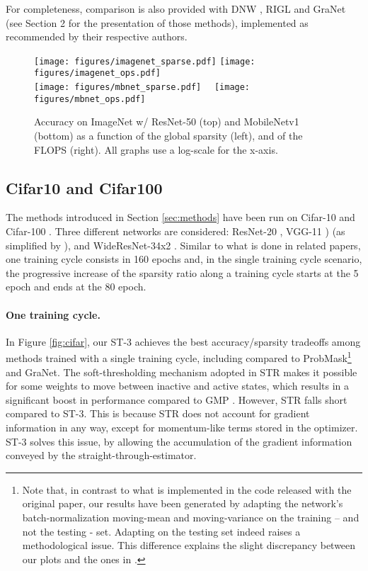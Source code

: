 \documentclass[10pt,twocolumn,letterpaper]{article}
\begin{document}
For completeness, comparison is also provided with DNW \cite{Wortsman2019}, RIGL \cite{Evci2020} and GraNet \cite{Liu2021} (see Section 2 for the presentation of those methods), implemented as recommended by their respective authors.

\begin{figure*}
  \centering
    \texttt{[image: figures/imagenet\_sparse.pdf]}
    \texttt{[image: figures/imagenet\_ops.pdf]}\\
    \texttt{[image: figures/mbnet\_sparse.pdf]}~~
    \texttt{[image: figures/mbnet\_ops.pdf]}
  \caption{Accuracy on ImageNet w/ ResNet-50 (top) and MobileNetv1 (bottom) as a function of the global sparsity (left), and of the FLOPS (right). All graphs use a log-scale for the x-axis.}\label{fig:imagenet}
\end{figure*}

\label{sec:cifar}

\subsection{Cifar10 and Cifar100}

The methods introduced in Section \ref{sec:methods} have been run on Cifar-10 and Cifar-100 \cite{Krizhevsky2009}. Three different networks are considered: ResNet-20 \cite{He2015}, VGG-11 \cite{Simonyan2014}) (as simplified by \cite{Liu2019}), and WideResNet-34x2 \cite{ZagoruykoK16}.
Similar to what is done in related papers, one training cycle consists in 160 epochs and, in the single training cycle scenario, the progressive increase of the sparsity ratio along a training cycle starts at the 5 epoch and ends at the 80 epoch.


\paragraph{One training cycle.} In Figure \ref{fig:cifar}, our ST-3 achieves the best accuracy/sparsity tradeoffs among methods trained with a single training cycle, including compared to ProbMask\cite{Zhou2021}\footnote{Note that, in contrast to what is implemented in the code released with the original paper, our results have been generated by adapting the network's batch-normalization moving-mean and moving-variance on the training – and not the testing - set. Adapting on the testing set indeed raises a methodological issue. This difference explains the slight discrepancy between our plots and the ones in \cite{Zhou2021}.} and GraNet\cite{Liu2021}. The soft-thresholding mechanism adopted in STR \cite{Kusupati2020} makes it possible for some weights to move between inactive and active states, which results in a significant boost in performance compared to GMP \cite{Zhu2018}. However, STR falls short compared to ST-3. This is because STR does not account for gradient information in any way, except for momentum-like terms stored in the optimizer. ST-3 solves this issue, by allowing the accumulation of the gradient information conveyed by the straight-through-estimator.  
\end{document}
